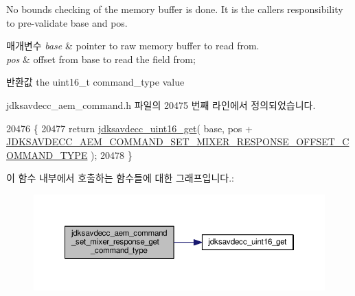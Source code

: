 No bounds checking of the memory buffer is done. It is the caller\textquotesingle{}s responsibility to pre-\/validate base and pos.


\begin{DoxyParams}{매개변수}
{\em base} & pointer to raw memory buffer to read from. \\
\hline
{\em pos} & offset from base to read the field from; \\
\hline
\end{DoxyParams}
\begin{DoxyReturn}{반환값}
the uint16\+\_\+t command\+\_\+type value 
\end{DoxyReturn}


jdksavdecc\+\_\+aem\+\_\+command.\+h 파일의 20475 번째 라인에서 정의되었습니다.


\begin{DoxyCode}
20476 \{
20477     \textcolor{keywordflow}{return} \hyperlink{group__endian_ga3fbbbc20be954aa61e039872965b0dc9}{jdksavdecc\_uint16\_get}( base, pos + 
      \hyperlink{group__command__set__mixer__response_ga067d468b0e600c9a1f6cff8b0891075b}{JDKSAVDECC\_AEM\_COMMAND\_SET\_MIXER\_RESPONSE\_OFFSET\_COMMAND\_TYPE}
       );
20478 \}
\end{DoxyCode}


이 함수 내부에서 호출하는 함수들에 대한 그래프입니다.\+:
\nopagebreak
\begin{figure}[H]
\begin{center}
\leavevmode
\includegraphics[width=350pt]{group__command__set__mixer__response_gabfd3ebe77009841333dc7f8ddd57ff26_cgraph}
\end{center}
\end{figure}


